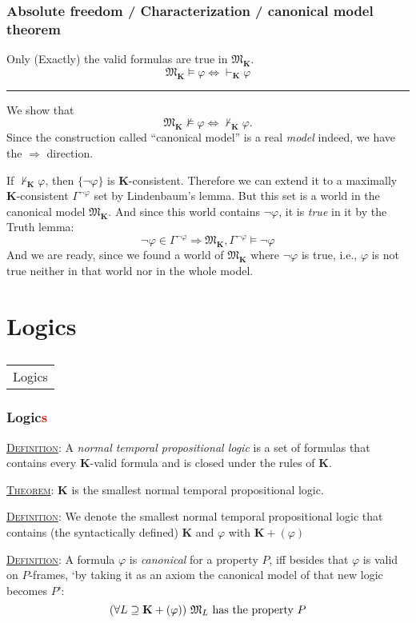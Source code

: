 \documentclass[xcolor=x11names]{beamer}
\makeatletter
\let\beamer@writeslidentry@miniframeson=\beamer@writeslidentry
\def\beamer@writeslidentry@miniframesoff{%
  \expandafter\beamer@ifempty\expandafter{\beamer@framestartpage}{}%
  {%
    \clearpage\beamer@notesactions%
  }
}
\newcommand*{\miniframeson}{\let\beamer@writeslidentry=\beamer@writeslidentry@miniframeson}
\newcommand*{\miniframesoff}{\let\beamer@writeslidentry=\beamer@writeslidentry@miniframesoff}
\newcommand{\cimdia}[1] {\miniframesoff \begin{frame}\begin{center}\huge \begin{tabular}{c}#1\end{tabular}\end{center}\end{frame}\miniframeson}
\newcommand{\szakasz}[2][]{\section{#1}\subsection{}\cimdia{#2}}
\newcommand{\dzsa}[1]{\textsc{\underline{#1}}:}
\newcommand{\cemph}[1]{\textcolor{red}{#1}}
\newcommand{\forallp}[1]{(\forall #1)}
\makeatother
\begin{document}

\begin{frame}
\frametitle{Absolute freedom / Characterization / canonical model theorem}
Only (Exactly) the valid formulas are true in $\mathfrak M_{\mathbf K}$.
\[ \mathfrak M_{\mathbf K} \models \varphi \iff \vdash_\mathbf K  \varphi \]
\hrule

\medskip

We show that
\[ \mathfrak M_{\mathbf K} \not\models \varphi \iff \not\vdash_\mathbf K  \varphi .\]
Since the construction called ``canonical model'' is a real \emph{model} indeed, we have the $\Rightarrow$ direction.

If $\not\vdash_\mathbf K \varphi$, then $\{\lnot \varphi\}$ is $\mathbf K$-consistent. Therefore we can extend it to a maximally $\mathbf K$-consistent $\Gamma^{\lnot \varphi}$ set by Lindenbaum's lemma. But this set is a world in the canonical model $\mathfrak M_\mathbf K$. And since this world contains $\lnot \varphi$, it is \emph{true} in it by the Truth lemma:
\[ \lnot \varphi \in \Gamma ^{\lnot \varphi} \Longrightarrow \mathfrak M _{\mathbf K} , \Gamma^{\lnot \varphi} \models \lnot \varphi \]
And we are ready, since we found a world of $\mathfrak M_\mathbf K$ where $\lnot \varphi$ is true, i.e., $\varphi$ is not true neither in that world nor in the whole model.

\end{frame}


\szakasz[Logics]{Logics}

\begin{frame}
\frametitle{Logic\cemph s}
\dzsa{Definition}
A \emph{normal temporal propositional logic} is a set of formulas that contains every $\mathbf K$-valid formula and is closed under the rules of $\mathbf K$.

\bigskip

\dzsa{Theorem}
$\mathbf K$ is the smallest normal temporal propositional logic.

\bigskip

\dzsa{Definition}
We denote the smallest normal temporal propositional logic that contains (the syntactically defined) $\mathbf K$ and $\varphi$ with $\mathbf K + (\varphi)$

\bigskip

\dzsa{Definition} A formula $\varphi$ is \emph{canonical} for a property $P$, iff besides that $\varphi$ is valid on $P$-frames, `by taking it as an axiom the canonical model of that new logic becomes $P$':
\[ \forallp {L\supseteq \mathbf K + (\varphi)} \textup{ $\mathfrak M _{L}$ has the property $P$} \]

\end{frame}
\end{document}
